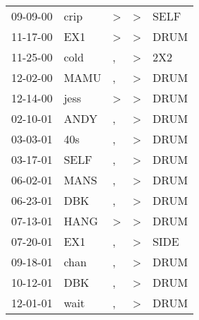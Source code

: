 \begin{supertabular}{p{0.07\textwidth}p{0.06\textwidth}p{0.02\textwidth}p{0.02\textwidth}p{0.06\textwidth}}
 09-09-00\textsuperscript{} &           crip\textsuperscript{} &     \textgreater &     \textgreater &          SELF\textsuperscript{} \\
 11-17-00\textsuperscript{} &            EX1\textsuperscript{} &     \textgreater &     \textgreater &          DRUM\textsuperscript{} \\
 11-25-00\textsuperscript{} &           cold\textsuperscript{} &                , &     \textgreater &           2X2\textsuperscript{} \\
 12-02-00\textsuperscript{} &           MAMU\textsuperscript{} &                , &     \textgreater &          DRUM\textsuperscript{} \\
 12-14-00\textsuperscript{} &           jess\textsuperscript{} &     \textgreater &     \textgreater &          DRUM\textsuperscript{} \\
 02-10-01\textsuperscript{} &           ANDY\textsuperscript{} &                , &     \textgreater &          DRUM\textsuperscript{} \\
 03-03-01\textsuperscript{} &            40s\textsuperscript{} &                , &     \textgreater &          DRUM\textsuperscript{} \\
 03-17-01\textsuperscript{} &           SELF\textsuperscript{} &                , &     \textgreater &          DRUM\textsuperscript{} \\
 06-02-01\textsuperscript{} &           MANS\textsuperscript{} &                , &     \textgreater &          DRUM\textsuperscript{} \\
 06-23-01\textsuperscript{} &            DBK\textsuperscript{} &                , &     \textgreater &          DRUM\textsuperscript{} \\
 07-13-01\textsuperscript{} &           HANG\textsuperscript{} &     \textgreater &     \textgreater &          DRUM\textsuperscript{} \\
 07-20-01\textsuperscript{} &            EX1\textsuperscript{} &                , &     \textgreater &          SIDE\textsuperscript{} \\
 09-18-01\textsuperscript{} &           chan\textsuperscript{} &                , &     \textgreater &          DRUM\textsuperscript{} \\
 10-12-01\textsuperscript{} &            DBK\textsuperscript{} &                , &     \textgreater &          DRUM\textsuperscript{} \\
 12-01-01\textsuperscript{} &           wait\textsuperscript{} &                , &     \textgreater &          DRUM\textsuperscript{} \\

\end{supertabular}
